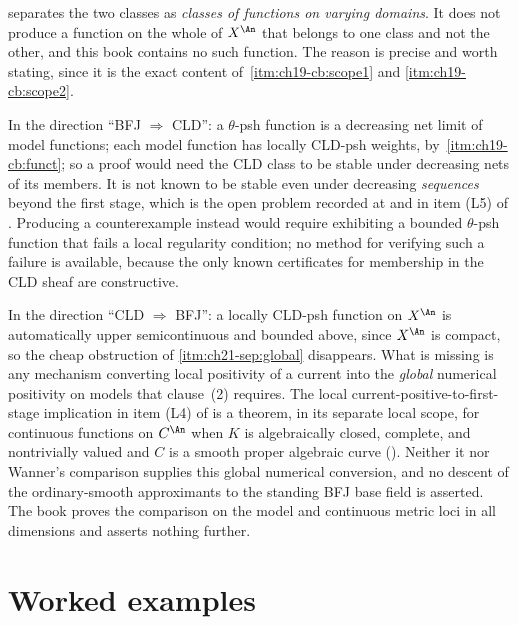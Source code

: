 \begin{remark}
\label{rem:ch21-no-separating-example}
 separates the two classes as \emph{classes of
functions on varying domains}.  It does not produce a function on the whole
of $X^{\An}$ that belongs to one class and not the other, and this book
contains no such function.  The reason is precise and worth stating, since
it is the exact content of
\,\cref{itm:ch19-cb:scope1} and
\cref{itm:ch19-cb:scope2}.

In the direction ``BFJ $\Rightarrow$ CLD'': a $\theta$-psh function is a
decreasing net limit of model functions; each model function has locally
CLD-psh weights, by
\,\cref{itm:ch19-cb:funct}; so a proof
would need the CLD class to be stable under decreasing nets of its members.
It is not known to be stable even under decreasing \emph{sequences} beyond
the first stage, which is the open problem recorded at
 and in item (L5) of
.  Producing a counterexample instead would
require exhibiting a bounded $\theta$-psh function that fails a local
regularity condition; no method for verifying such a failure is available,
because the only known certificates for membership in the CLD sheaf are
constructive.

In the direction ``CLD $\Rightarrow$ BFJ'': a locally CLD-psh function on
$X^{\An}$ is automatically upper semicontinuous and bounded above, since
$X^{\An}$ is compact, so the cheap obstruction of
\cref{itm:ch21-sep:global} disappears.  What is missing is any mechanism
converting local positivity of a current into the \emph{global} numerical
positivity on models that clause~(2) requires.  The local
current-positive-to-first-stage implication in item (L4) of
 is a theorem, in its separate local scope,
for continuous functions on $C^{\An}$ when $K$ is algebraically closed,
complete, and nontrivially valued and $C$ is a smooth proper algebraic curve
().  Neither it nor
Wanner's comparison supplies this global numerical conversion, and no
descent of the ordinary-smooth approximants to the standing BFJ base field
is asserted.  The book proves the comparison on the model and continuous
metric loci in all dimensions and asserts nothing further.
\end{remark}

\section{Worked examples}
\label{sec:ch21-worked}


